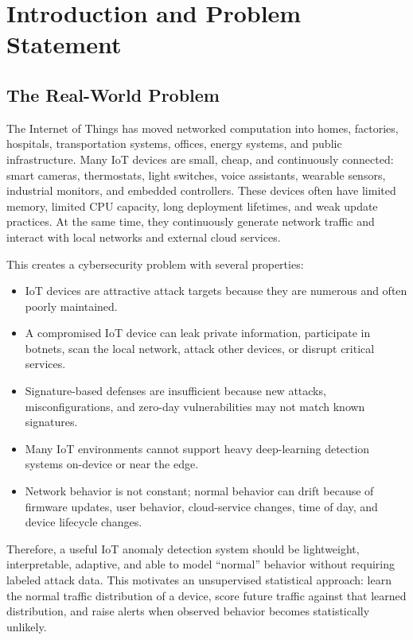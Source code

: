 \documentclass[11pt,a4paper]{article}
\begin{document}
\section{Introduction and Problem Statement}

\subsection{The Real-World Problem}

The Internet of Things has moved networked computation into homes, factories, hospitals, transportation systems, offices, energy systems, and public infrastructure. Many IoT devices are small, cheap, and continuously connected: smart cameras, thermostats, light switches, voice assistants, wearable sensors, industrial monitors, and embedded controllers. These devices often have limited memory, limited CPU capacity, long deployment lifetimes, and weak update practices. At the same time, they continuously generate network traffic and interact with local networks and external cloud services.

This creates a cybersecurity problem with several properties:

\begin{itemize}
  \item IoT devices are attractive attack targets because they are numerous and often poorly maintained.
  \item A compromised IoT device can leak private information, participate in botnets, scan the local network, attack other devices, or disrupt critical services.
  \item Signature-based defenses are insufficient because new attacks, misconfigurations, and zero-day vulnerabilities may not match known signatures.
  \item Many IoT environments cannot support heavy deep-learning detection systems on-device or near the edge.
  \item Network behavior is not constant; normal behavior can drift because of firmware updates, user behavior, cloud-service changes, time of day, and device lifecycle changes.
\end{itemize}

Therefore, a useful IoT anomaly detection system should be lightweight, interpretable, adaptive, and able to model ``normal'' behavior without requiring labeled attack data. This motivates an unsupervised statistical approach: learn the normal traffic distribution of a device, score future traffic against that learned distribution, and raise alerts when observed behavior becomes statistically unlikely.
\end{document}
